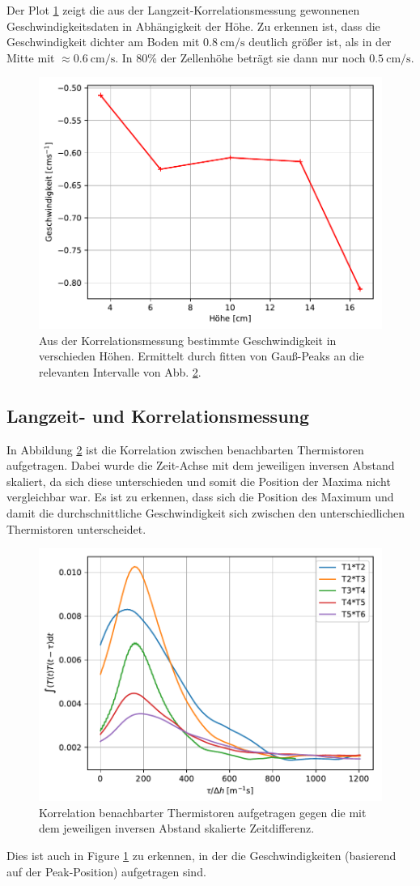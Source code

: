 \documentclass[12pt,a4paper,titlepage,headinclude]{scrartcl}
\numberwithin{equation}{subsection}
\begin{document}
Der Plot \ref{fig:v_hoehe} zeigt die aus der Langzeit-Korrelationsmessung gewonnenen Geschwindigkeitsdaten in Abhängigkeit der Höhe.
Zu erkennen ist, dass die Geschwindigkeit dichter am Boden mit $\SI{0.8}{\centi\meter\per\second}$ deutlich größer ist, als in der Mitte mit $\approx\SI{0.6}{\centi\meter\per\second}$.
In 80\% der Zellenhöhe beträgt sie dann nur noch $\SI{0.5}{\centi\meter\per\second}$.
\begin{figure}[h]
	\centering
	\includegraphics[width=0.7\linewidth]{v_hoehe}
	\caption{Aus der Korrelationsmessung bestimmte Geschwindigkeit in verschieden Höhen. Ermittelt durch fitten von Gauß-Peaks an die relevanten Intervalle von Abb. \ref{fig:tempcorell}.}
	\label{fig:v_hoehe}
\end{figure}


\subsection{Langzeit- und Korrelationsmessung}
\label{sec:korrel}
In Abbildung \ref{fig:tempcorell} ist die Korrelation zwischen benachbarten Thermistoren aufgetragen.
Dabei wurde die Zeit-Achse mit dem jeweiligen inversen Abstand skaliert, da sich diese unterschieden und somit die Position der Maxima nicht vergleichbar war.
Es ist zu erkennen, dass sich die Position des Maximum und damit die durchschnittliche Geschwindigkeit sich zwischen den unterschiedlichen Thermistoren unterscheidet.
\begin{figure}[h]
	\centering
	\includegraphics[width=0.7\linewidth]{tempcorell}
	\caption{Korrelation benachbarter Thermistoren aufgetragen gegen die mit dem jeweiligen inversen Abstand skalierte Zeitdifferenz.}
	\label{fig:tempcorell}
\end{figure}
Dies ist auch in Figure \ref{fig:v_hoehe} zu erkennen, in der die Geschwindigkeiten (basierend auf der Peak-Position) aufgetragen sind.
\end{document}
